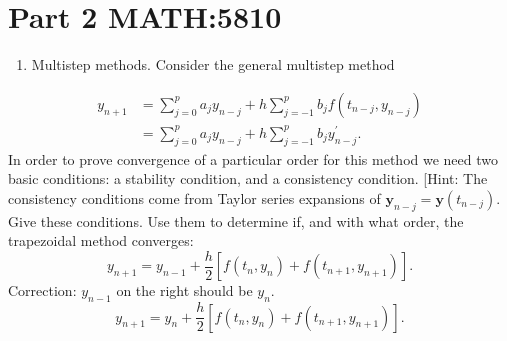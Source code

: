 \documentclass[10pt]{article}
\begin{document}
\section{Part 2 MATH:5810}
\begin{enumerate}
  \item Multistep methods. Consider the general multistep method
\end{enumerate}
$$
\begin{aligned}
y_{n+1} &=\sum_{j=0}^{p} a_{j} y_{n-j}+h \sum_{j=-1}^{p} b_{j} f\left(t_{n-j}, y_{n-j}\right) \\
&=\sum_{j=0}^{p} a_{j} y_{n-j}+h \sum_{j=-1}^{p} b_{j} y_{n-j}^{\prime} .
\end{aligned}
$$
In order to prove convergence of a particular order for this method we need two basic conditions: a stability condition, and a consistency condition. [Hint: The consistency conditions come from Taylor series expansions of $\boldsymbol{y}_{n-j}=\boldsymbol{y}\left(t_{n-j}\right)$. Give these conditions. Use them to determine if, and with what order, the trapezoidal method converges:
$$
y_{n+1}=y_{n-1}+\frac{h}{2}\left[f\left(t_{n}, y_{n}\right)+f\left(t_{n+1}, y_{n+1}\right)\right] .
$$
Correction: $y_{n-1}$ on the right should be $y_{n}$.
$$
y_{n+1}=y_{n}+\frac{h}{2}\left[f\left(t_{n}, y_{n}\right)+f\left(t_{n+1}, y_{n+1}\right)\right] .
$$
\end{document}
